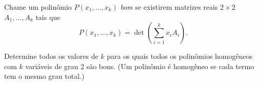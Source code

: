 Chame um polinômio \( P(x_{1}, \ldots, x_{k})\) \textit{bom} se existirem matrizes reais \( 2\times 2\) \( A_{1}, \ldots, A_{k}\) tais que
\[P(x_{1}, \ldots, x_{k}) = \det \left(\sum_{i=1}^{k}x_{i}A_{i}\right).\]

Determine todos os valores de \( k\) para os quais todos os polinômios homogêneos com \( k\) variáveis de grau 2 são bons. (Um polinômio é homogêneo se cada termo tem o mesmo grau total.)
